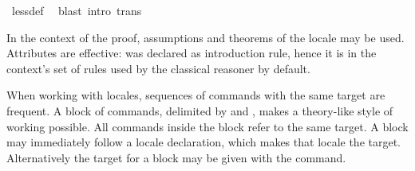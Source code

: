 \begin{isabellebody}
\ less{\isacharunderscore}def\ \isamarkupfalse%
\ {\isacharparenleft}blast\ intro{\isacharcolon}\ trans{\isacharparenright}%
\endisatagvisible
{\isafoldvisible}%
%
\isadelimvisible
%
\endisadelimvisible
%
\begin{isamarkuptext}%
In the context of the proof, assumptions and theorems of the
  locale may be used.  Attributes are effective:  was
  declared as introduction rule, hence it is in the context's set of
  rules used by the classical reasoner by default.%
\end{isamarkuptext}%
\isamarkuptrue%
%
\begin{isamarkuptext}%
When working with locales, sequences of commands with the same
  target are frequent.  A block of commands, delimited by
   and , makes a theory-like style
  of working possible.  All commands inside the block refer to the
  same target.  A block may immediately follow a locale
  declaration, which makes that locale the target.  Alternatively the
  target for a block may be given with the 
  command.


\end{isamarkuptext}
\end{isabellebody}
